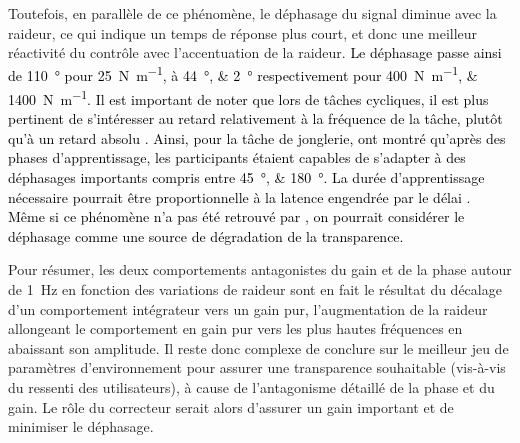 Toutefois, en parallèle de ce phénomène, le déphasage du signal diminue avec la raideur, ce qui indique un temps de réponse plus court, et donc une meilleur réactivité du contrôle avec l'accentuation de la raideur. %
%
\textcolor{black}{Le déphasage passe ainsi de \SI{110}{\degree} pour \SI{25}{\newton\per\meter}, à \SIlist{44;2}{\degree} respectivement pour \SIlist{400;1400}{\newton\per\meter}. Il est important de noter que lors de tâches cycliques, il est plus pertinent de s'intéresser au retard relativement à la fréquence de la tâche, plutôt qu'à un retard absolu \parencite{langenberg_sinusoidal_1998}. Ainsi, pour la tâche de jonglerie, \textcite{morice_learning_2007} ont montré qu'après des phases d'apprentissage, les participants étaient capables de s'adapter à des déphasages importants compris entre \SIlist{45;180}{\degree}. La durée d'apprentissage nécessaire pourrait être proportionnelle à la latence engendrée par le délai \parencite{foulkes_adaptation_2000}. Même si ce phénomène n'a pas été retrouvé par \textcite{morice_learning_2007}, on pourrait considérer le déphasage comme une source de dégradation de la transparence.}

Pour résumer, les deux comportements antagonistes du gain et de la phase autour de \SI{1}{\hertz} en fonction des variations de raideur sont en fait le résultat du décalage d'un comportement intégrateur vers un gain pur, l'augmentation de la raideur allongeant le comportement en gain pur vers les plus hautes fréquences en abaissant son amplitude. Il reste donc complexe de conclure sur le meilleur jeu de paramètres d'environnement pour assurer une transparence souhaitable (vis-à-vis du ressenti des utilisateurs), à cause de l'antagonisme détaillé de la phase et du gain. Le rôle du correcteur serait alors d'assurer un gain important et de minimiser le déphasage.





